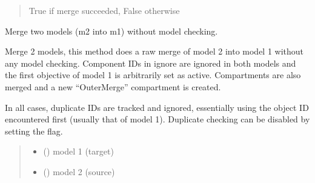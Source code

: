 \documentclass[letterpaper,12pt,english]{sphinxmanual}
\begin{document}
\begin{fulllineitems}
\begin{quote}
\begin{description}
\begin{itemize}
\end{itemize}

\sphinxAtStartPar
{} \textendash{} True if merge succeeded, False otherwise

\end{description}\end{quote}

\end{fulllineitems}


\begin{fulllineitems}
\label{\detokenize{api/core:cbmpy.CBTools.merge2Models}}
\pysigstartsignatures
\pysiglinewithargsret
{}
{\sphinxparamcomma {}\sphinxparamcomma {}\sphinxparamcomma {}}
{}
\pysigstopsignatures
\sphinxAtStartPar
Merge two models (m2 into m1) without model checking.

\sphinxAtStartPar
Merge 2 models, this method does a raw merge of model 2 into model 1
without any model checking. Component IDs in ignore are ignored in both
models and the first objective of model 1 is arbitrarily set as active.
Compartments are also merged and a new “OuterMerge” compartment is created.

\sphinxAtStartPar
In all cases, duplicate IDs are tracked and ignored, essentially using
the object ID encountered first (usually that of model 1). Duplicate
checking can be disabled by setting the  flag.
\begin{quote}\begin{description}
\begin{itemize}
\item {} 
\sphinxAtStartPar
{} () \textendash{} model 1 (target)

\item {} 
\sphinxAtStartPar
{} () \textendash{} model 2 (source)


\end{itemize}
\end{description}
\end{quote}
\end{fulllineitems}
\end{document}
